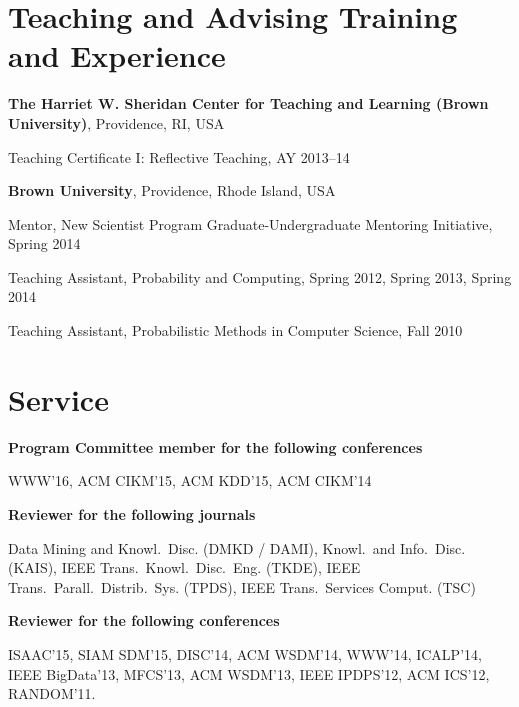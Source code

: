 \documentclass[margin,line]{resume}
\begin{document}
\section{\sc Teaching and Advising Training and Experience}
{\bf The Harriet W. Sheridan Center for Teaching and Learning (Brown
University)}, Providence, RI, USA
\begin{list2}
\vspace*{.05in}
\item Teaching Certificate I: Reflective Teaching, AY 2013--14
\end{list2}

{\bf Brown University}, Providence, Rhode Island, USA

\begin{list2}
\vspace*{.05in}
\item Mentor, New Scientist Program Graduate-Undergraduate Mentoring Initiative, Spring 2014
\item Teaching Assistant, Probability and Computing, Spring 2012, Spring 2013, Spring 2014
\item Teaching Assistant, Probabilistic Methods in Computer Science, Fall 2010
\end{list2}

\section{\sc Service}
{\bf Program Committee member for the following conferences}
\begin{list2}
\vspace*{.05in}
\item WWW'16, ACM CIKM'15, ACM KDD'15, ACM CIKM'14
\end{list2}

{\bf Reviewer for the following journals}
\begin{list2}
\vspace*{.05in}
\item Data Mining and Knowl.~Disc. (DMKD / DAMI), Knowl.~and Info.~Disc. (KAIS),
	IEEE Trans.~Knowl.~Disc.~Eng. (TKDE), IEEE Trans.~Parall.~Distrib.~Sys.
	(TPDS), IEEE Trans.~Services Comput. (TSC)
\end{list2}

{\bf Reviewer for the following conferences}
\begin{list2}
\vspace*{.05in}
\item ISAAC'15, SIAM SDM'15, DISC'14, ACM WSDM'14, WWW'14, ICALP'14, IEEE
	BigData'13, MFCS'13, ACM WSDM'13, IEEE IPDPS'12, ACM ICS'12, RANDOM'11.
\end{list2}
\end{document}
